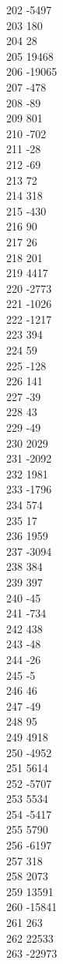 { 202	-5497 \\
 203	180 \\
 204	28 \\
 205	19468 \\
 206	-19065 \\
 207	-478 \\
 208	-89 \\
 209	801 \\
 210	-702 \\
 211	-28 \\
 212	-69 \\
 213	72 \\
 214	318 \\
 215	-430 \\
 216	90 \\
 217	26 \\
 218	201 \\
 219	4417 \\
 220	-2773 \\
 221	-1026 \\
 222	-1217 \\
 223	394 \\
 224	59 \\
 225	-128 \\
 226	141 \\
 227	-39 \\
 228	43 \\
 229	-49 \\
 230	2029 \\
 231	-2092 \\
 232	1981 \\
 233	-1796 \\
 234	574 \\
 235	17 \\
 236	1959 \\
 237	-3094 \\
 238	384 \\
 239	397 \\
 240	-45 \\
 241	-734 \\
 242	438 \\
 243	-48 \\
 244	-26 \\
 245	-5 \\
 246	46 \\
 247	-49 \\
 248	95 \\
 249	4918 \\
 250	-4952 \\
 251	5614 \\
 252	-5707 \\
 253	5534 \\
 254	-5417 \\
 255	5790 \\
 256	-6197 \\
 257	318 \\
 258	2073 \\
 259	13591 \\
 260	-15841 \\
 261	263 \\
 262	22533 \\
 263	-22973 \\
}
